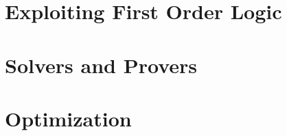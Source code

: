 
\section{Exploiting First Order Logic}
\label{sec:exploiting_first_order_logic}

\section{Solvers and Provers}
\label{sec:solvers_and_provers}

\section{Optimization}
\label{sec:optimization}
